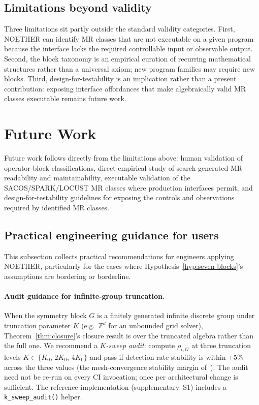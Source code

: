 \documentclass[manuscript]{acmart}
\begin{document}
\subsection{Limitations beyond validity}
\label{subsec:limitations-beyond-validity}

Three limitations sit partly outside the standard validity categories. First, NOETHER can identify MR classes that are not executable on a given program because the interface lacks the required controllable input or observable output. Second, the block taxonomy is an empirical curation of recurring mathematical structures rather than a universal axiom; new program families may require new blocks. Third, design-for-testability is an implication rather than a present contribution: exposing interface affordances that make algebraically valid MR classes executable remains future work.

\section{Future Work}
\label{sec:future-work}

Future work follows directly from the limitations above: human validation of operator-block classifications, direct empirical study of search-generated MR readability and maintainability, executable validation of the SACOS/SPARK/LOCUST MR classes where production interfaces permit, and design-for-testability guidelines for exposing the controls and observations required by identified MR classes.

\subsection{Practical engineering guidance for users}
\label{subsec:engineering-guidance}

This subsection collects practical recommendations for engineers applying NOETHER, particularly for the cases where Hypothesis~\ref{hyp:seven-blocks}'s assumptions are bordering or borderline.

\paragraph{Audit guidance for infinite-group truncation.} When the symmetry block $G$ is a finitely generated infinite discrete group under truncation parameter $K$ (e.g.\ $\mathbb{Z}^{d}$ for an unbounded grid solver), Theorem~\ref{thm:closure}'s closure result is over the truncated algebra rather than the full one. We recommend a \emph{$K$-sweep audit}: compute $\rho_{\iota,G}$ at three truncation levels $K \in \{K_0,\, 2K_0,\, 4K_0\}$ and pass if detection-rate stability is within $\pm 5\%$ across the three values (the mesh-convergence stability margin of~\cite[\S6.2]{LewisMiller1993}). The audit need not be re-run on every CI invocation; once per architectural change is sufficient. The reference implementation (supplementary~S1) includes a \texttt{k\_sweep\_audit()} helper.
\end{document}
